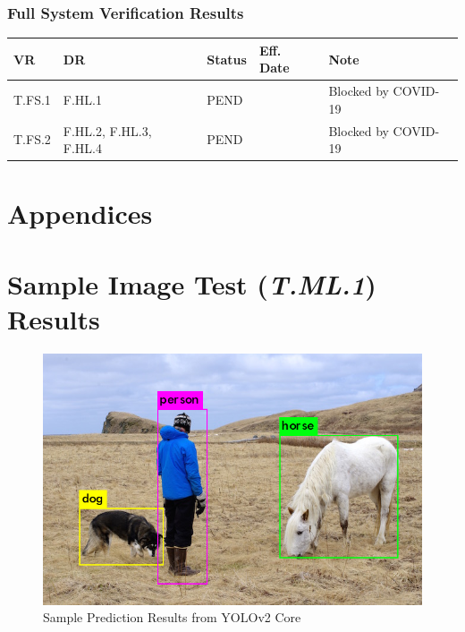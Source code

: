 \documentclass[10pt,letterpaper]{article}
\begin{document}
\subsubsection{Full System Verification Results}
\begin{table}[H]
	\centering
	\begin{tabular}{lllll}
	\hline
	\textbf{VR} & \textbf{DR} & \textbf{Status} & \textbf{Eff. Date} & \textbf{Note}\\
	\hline
    T.FS.1 & F.HL.1  & PEND   &  & Blocked by COVID-19\\
	T.FS.2 & F.HL.2, F.HL.3, F.HL.4 & PEND  & & Blocked by COVID-19\\
	\hline
	\end{tabular}
\end{table}



%
%

 \clearpage
 \appendix
 \section*{Appendices}
 \section{Sample Image Test (\textit{T.ML.1}) Results}\label{appendix:T.ML.1}
 
\begin{figure}[H]
\centering
\includegraphics[width=12.5cm]{img/pred.png}
\caption{Sample Prediction Results from YOLOv2 Core}
\label{ml_demo}
\end{figure} 
 
\end{document}
